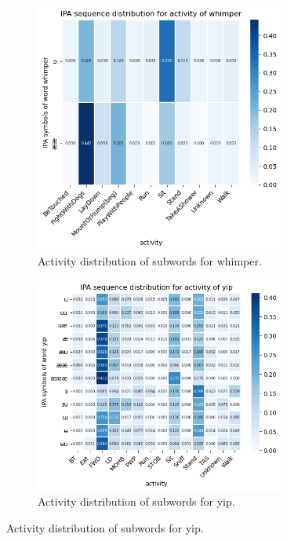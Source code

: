 \documentclass[letterpaper]{article}
\begin{document}
\begin{figure}[h]
\begin{subfigure}[]{0.4\textwidth}
	\centering
	\includegraphics[width=0.9\textwidth]{images/ipa_whimper.png}
	\caption{Activity distribution of subwords for whimper.}
\label{fig:3}
\end{subfigure}
\begin{subfigure}[]{0.4\textwidth}
	\centering
	\includegraphics[width=0.9\textwidth]{images/output.png}
	\caption{Activity distribution of subwords for yip.}
\label{fig:4}
\end{subfigure}


\end{figure}
\end{document}
